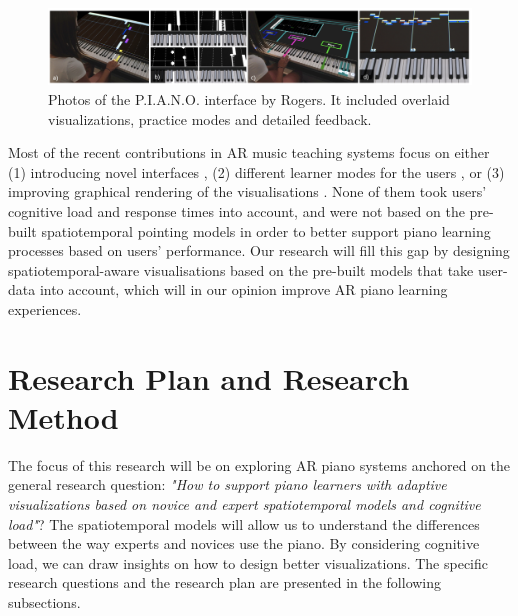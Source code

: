 \documentclass[manuscript,screen]{acmart}
\begin{document}
\begin{figure}[h]
\centering
 \includegraphics[width=12cm]{figures/pianoUBC.png}
    \caption{Photos of the P.I.A.N.O. interface by Rogers. It included overlaid visualizations, practice modes and detailed feedback. 
    }\label{fig:ubicomp}
\end{figure}

Most of the recent contributions in AR music teaching systems focus on either (1) introducing novel interfaces \cite{barakonyi2005augmented, huang2011piano}, (2) different learner modes for the users \cite{weing2013piano, rogers2014piano}, or (3) improving graphical rendering of the visualisations \cite{chow2013music, zheng2013general}. None of them took users’ cognitive load and response times into account, and were not based on the pre-built spatiotemporal pointing models in order to better support piano learning processes based on users’ performance. Our research will fill this gap by designing spatiotemporal-aware visualisations based on the pre-built models that take user-data into account, which will in our opinion improve AR piano learning experiences.\\

\section{Research Plan and Research Method}
\label{sec:plan}
The focus of this research will be on exploring AR piano systems anchored on the general research question: \textit{"How to support piano learners with adaptive visualizations based on novice and expert spatiotemporal models and cognitive load"}? The spatiotemporal models will allow us to understand the differences between the way experts and novices use the piano. By considering cognitive load, we can draw insights on how to design better visualizations. The specific research questions and the research plan are presented in the following subsections. 
\end{document}
